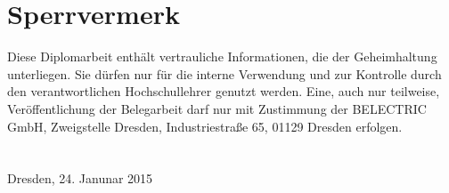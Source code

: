 \chapter*{Sperrvermerk}\thispagestyle{fancy}

Diese Diplomarbeit enthält vertrauliche Informationen, die der Geheimhaltung unterliegen. Sie dürfen nur für die interne Verwendung und zur Kontrolle durch den verantwortlichen Hochschullehrer genutzt werden. Eine, auch nur teilweise, Veröffentlichung der Belegarbeit darf nur mit Zustimmung der BELECTRIC GmbH, Zweigstelle Dresden, Industriestraße 65, 01129 Dresden erfolgen.
\\ 
\\
\\
{\LARGE Dresden, 24. Janunar 2015}\\

